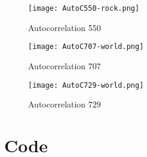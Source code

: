 \documentclass{article} %
\begin{document}
\begin{figure}[H]
\centering
\texttt{[image: AutoC550-rock.png]}
\caption{Autocorrelation 550}
\label{fig:auto550_1}
\end{figure}

\begin{figure}[H]
\centering
\texttt{[image: AutoC707-world.png]}
\caption{Autocorrelation 707}
\label{fig:auto707_1}
\end{figure}

\begin{figure}[H]
\centering
\texttt{[image: AutoC729-world.png]}
\caption{Autocorrelation 729}
\label{fig:auto729_1}
\end{figure}
\clearpage



\clearpage
\section{Code}


















\end{document}
